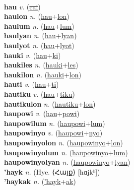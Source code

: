  \label{haiki} \\
\textbf{hau} \textit{v.} (\hyperref[cai]{\sout{cai}})
 \label{hau} \\
\textbf{haulon} \textit{n.} (\hyperref[hau]{hau}+\hyperref[lon]{lon})
 \label{haulon} \\
\textbf{haulum} \textit{n.} (\hyperref[hau]{hau}+\hyperref[lum]{lum})
 \label{haulum} \\
\textbf{haulyan} \textit{n.} (\hyperref[hau]{hau}+\hyperref[lyan]{lyan})
 \label{haulyan} \\
\textbf{haulyot} \textit{n.} (\hyperref[hau]{hau}+\hyperref[lyot]{lyot})
 \label{haulyot} \\
\textbf{hauki} \textit{v.} (\hyperref[hau]{hau}+\hyperref[ki]{ki})
 \label{hauki} \\
\textbf{haukiles} \textit{n.} (\hyperref[hauki]{hauki}+\hyperref[les]{les})
 \label{haukiles} \\
\textbf{haukilon} \textit{n.} (\hyperref[hauki]{hauki}+\hyperref[lon]{lon})
 \label{haukilon} \\
\textbf{hauti} \textit{v.} (\hyperref[hau]{hau}+\hyperref[ti]{ti})
 \label{hauti} \\
\textbf{hautiku} \textit{v.} (\hyperref[hau]{hau}+\hyperref[tiku]{tiku})
 \label{hautiku} \\
\textbf{hautikulon} \textit{n.} (\hyperref[hautiku]{hautiku}+\hyperref[lon]{lon})
 \label{hautikulon} \\
\textbf{haupowi} \textit{v.} (\hyperref[hau]{hau}+\hyperref[powi]{powi})
 \label{haupowi} \\
\textbf{haupowilum} \textit{n.} (\hyperref[haupowi]{haupowi}+\hyperref[lum]{lum})
 \label{haupowilum} \\
\textbf{haupowinyo} \textit{v.} (\hyperref[haupowi]{haupowi}+\hyperref[nyo]{nyo})
 \label{haupowinyo} \\
\textbf{haupowinyolon} \textit{n.} (\hyperref[haupowinyo]{haupowinyo}+\hyperref[lon]{lon})
 \label{haupowinyolon} \\
\textbf{haupowinyolum} \textit{n.} (\hyperref[haupowinyo]{haupowinyo}+\hyperref[lum]{lum})
 \label{haupowinyolum} \\
\textbf{haupowinyolyan} \textit{n.} (\hyperref[haupowinyo]{haupowinyo}+\hyperref[lyan]{lyan})
 \label{haupowinyolyan} \\
\textbf{'hayk} \textit{n.} (Hye. ⟨Հայք⟩ [hɑjkʰ])
 \label{'hayk} \\
\textbf{'haykak} \textit{n.} (\hyperref['hayk]{'hayk}+\hyperref[ak]{ak})
 \label{'haykak} \\
